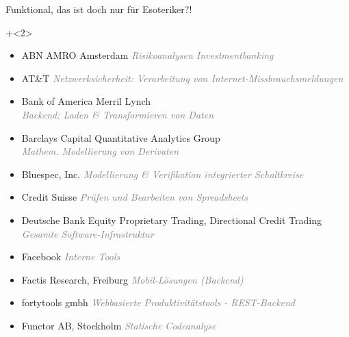 \begin{frame}[fragile]{Funktional, das ist doch nur für Esoteriker?!}

\onslide+<2>
\begin{itemize}
\item ABN AMRO Amsterdam \textcolor{gray}{\textit{Risikoanalysen Investmentbanking}}
\item AT\&T \textcolor{gray}{\textit{Netzwerksicherheit: Verarbeitung von Internet-Missbrauchsmeldungen}}
\item Bank of America Merril Lynch \\ \textcolor{gray}{\textit{Backend: Laden \& Transformieren von Daten}}
\item Barclays Capital Quantitative Analytics Group \\ \textcolor{gray}{\textit{Mathem. Modellierung von Derivaten}}
\item Bluespec, Inc. \textcolor{gray}{\textit{Modellierung \& Verifikation integrierter Schaltkreise}}
\item Credit Suisse \textcolor{gray}{\textit{Prüfen und Bearbeiten von Spreadsheets}}
\item Deutsche Bank Equity Proprietary Trading, Directional Credit Trading \textcolor{gray}{\textit{Gesamte Software-Infrastruktur}}
\item Facebook \textcolor{gray}{\textit{Interne Tools}}
\item Factis Research, Freiburg \textcolor{gray}{\textit{Mobil-Lösungen (Backend)}}
\item fortytools gmbh \textcolor{gray}{\textit{Webbasierte Produktivitätstools - REST-Backend}}
\item Functor AB, Stockholm \textcolor{gray}{\textit{Statische Codeanalyse}}
\end{itemize}
\end{frame}

